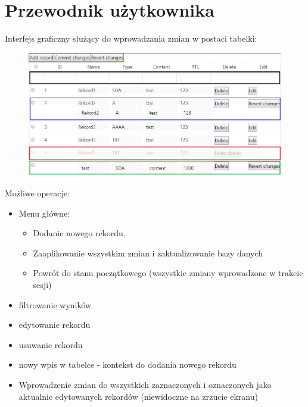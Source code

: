 \documentclass[12pt] {article}
\begin{document}
\newpage
\section{Przewodnik użytkownika}



Interfejs graficzny służący do wprowadzania zmian w postaci tabelki:
\begin{figure}[H]
\centering
\includegraphics[width=\textwidth]{res/Tabelka}
\end{figure}


Możliwe operacje:
\begin{itemize}
\item \color{brown} Menu główne: 
\begin{itemize}
\item Dodanie nowego rekordu.
\item Zaaplikowanie wszystkim zmian i zaktualizowanie bazy danych
\item Powrót do stanu początkowego (wszystkie zmiany wprowadzone w trakcie sesji)
\end{itemize} \color{black}
\item \color{black} filtrowanie wyników \color{black}
\item \color{ao} edytowanie rekordu \color{black}
\item \color{red} usuwanie rekordu \color{black}
\item \color{forestgreen(web)} nowy wpis w tabelce - kontekst do dodania nowego rekordu \color{black}
\item Wprowadzenie zmian do wszystkich zaznaczonych i oznaczonych jako aktualnie edytowanych rekordów (niewidoczne na zrzucie ekranu)
\end{itemize}
\end{document}

